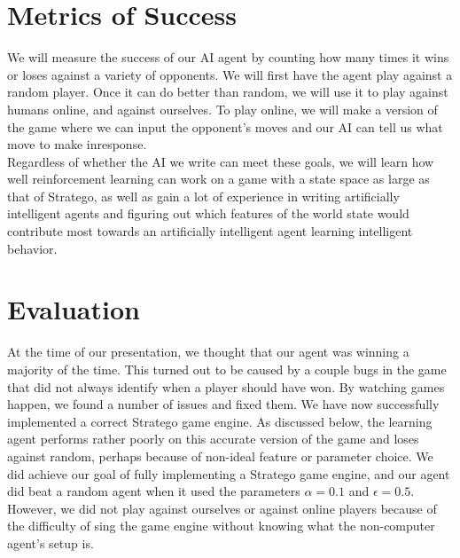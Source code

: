 \documentclass[letterpaper]{article}
\begin{document}
%

\section{Metrics of Success}
We will measure the success of our AI agent by counting how many times it wins or loses against a variety of opponents. We will first have the agent play against a random player. Once it can do better than random, we will use it to play against humans online, and against ourselves.  To play online, we will make a version of the game where we can input the opponent's moves and our AI can tell us what move to make inresponse.\\

Regardless of whether the AI we write can meet these goals, we will learn how well reinforcement learning can work on a game with a state space as large as that of Stratego, as well as gain a lot of experience in writing artificially intelligent agents and figuring out which features of the world state would contribute most towards an artificially intelligent agent learning intelligent behavior.
\\

\section{Evaluation}
At the time of our presentation, we thought that our agent was winning a majority of the time. This turned out to be caused
by a couple bugs in the game that did not always identify when a player should have won. 
By watching games happen, we found a number of 
issues and fixed them. We have now successfully implemented a correct Stratego game engine. 
As discussed below, the learning 
agent performs rather poorly on this accurate version of the game and loses against random, perhaps because of non-ideal
feature or parameter choice. We did achieve our goal of fully implementing a Stratego game engine, and our agent did beat
a random agent when it used the parameters $\alpha =0.1$ and $\epsilon = 0.5$.
However, we did not play against ourselves or against online players because of the difficulty of sing the game engine
without knowing what the non-computer agent's setup is.
\end{document}

